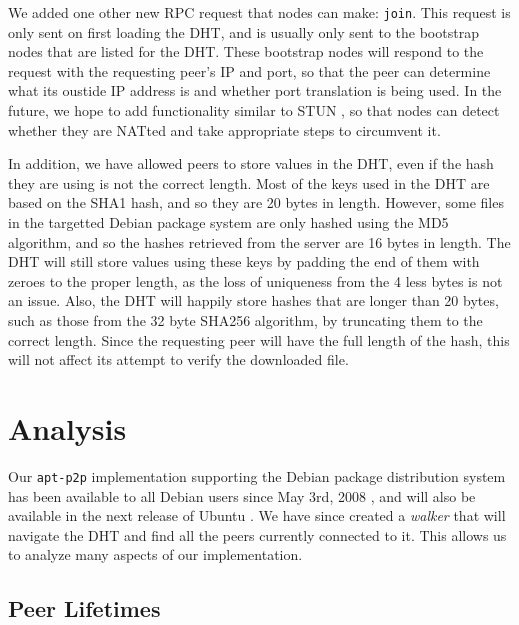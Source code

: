 \documentclass[conference]{IEEEtran}
\begin{document}
We added one other new RPC request that nodes can make:
\texttt{join}. This request is only sent on first loading the DHT,
and is usually only sent to the bootstrap nodes that are listed for
the DHT. These bootstrap nodes will respond to the request with the
requesting peer's IP and port, so that the peer can determine what
its oustide IP address is and whether port translation is being
used. In the future, we hope to add functionality similar to STUN
\cite{STUN}, so that nodes can detect whether they are NATted and
take appropriate steps to circumvent it.

In addition, we have allowed peers to store values in the DHT, even
if the hash they are using is not the correct length. Most of the
keys used in the DHT are based on the SHA1 hash, and so they are 20
bytes in length. However, some files in the targetted Debian package
system are only hashed using the MD5 algorithm, and so the hashes
retrieved from the server are 16 bytes in length. The DHT will still
store values using these keys by padding the end of them with zeroes
to the proper length, as the loss of uniqueness from the 4 less
bytes is not an issue. Also, the DHT will happily store hashes that
are longer than 20 bytes, such as those from the 32 byte SHA256
algorithm, by truncating them to the correct length. Since the
requesting peer will have the full length of the hash, this will not
affect its attempt to verify the downloaded file.


\section{Analysis}
\label{analysis}

Our \texttt{apt-p2p} implementation supporting the Debian package
distribution system has been available to all Debian users since May
3rd, 2008 \cite{apt-p2p-debian}, and will also be available in the
next release of Ubuntu \cite{apt-p2p-ubuntu}. We have since created
a \emph{walker} that will navigate the DHT and find all the peers
currently connected to it. This allows us to analyze many aspects of
our implementation.

\subsection{Peer Lifetimes}
\label{peer_life}
\end{document}
